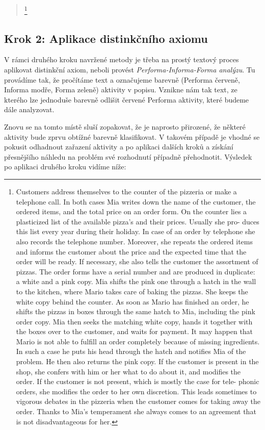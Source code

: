 \begin{quote}
\footnote{Customers address themselves to the counter of the pizzeria or make a telephone call. In both cases Mia writes down the name of the customer, the ordered items, and the total price on an order form. On the counter lies a plasticized list of the available pizza’s and their prices. Usually she pro- duces this list every year during their holiday. In case of an order by telephone she also records the telephone number. Moreover, she repeats the ordered items and informs the customer about the price and the expected time that the order will be ready. If necessary, she also tells the customer the assortment of pizzas. The order forms have a serial number and are produced in duplicate: a white and a pink copy. Mia shifts the pink one through a hatch in the wall to the kitchen, where Mario takes care of baking the pizzas. She keeps the white copy behind the counter. As soon as Mario has finished an order, he shifts the pizzas in boxes through the same hatch to Mia, including the pink order copy. Mia then seeks the matching white copy, hands it together with the boxes over to the customer, and waits for payment. It may happen that Mario is not able to fulfill an order completely because of missing ingredients. In such a case he puts his head through the hatch and notifies Mia of the problem. He then also returns the pink copy. If the customer is present in the shop, she confers with him or her what to do about it, and modifies the order. If the customer is not present, which is mostly the case for tele- phonic orders, she modifies the order to her own discretion. This leads sometimes to vigorous debates in the pizzeria when the customer comes for taking away the order. Thanks to Mia’s temperament she always comes to an agreement that is not disadvantageous for her.}
\end{quote}

\subsection{Krok 2: Aplikace distinkčního axiomu}
V rámci druhého kroku navržené metody je třeba na prostý textový proces aplikovat distinkční axiom, neboli provést \textit{Performa-Informa-Forma analýzu}. Tu provádíme tak, že pročítáme text a označujeme barevně (Performa červeně, Informa modře, Forma zeleně) aktivity v popisu. Vznikne nám tak text, ze kterého lze jednoduše barevně odlišit červené Performa aktivity, které budeme dále analyzovat.

Znovu se na tomto místě sluší zopakovat, že je naprosto přirozené, že některé aktivity bude zprvu obtížné barevně klasifikovat. V takovém případě je vhodné se pokusit odhadnout zařazení aktivity a po aplikaci dalších kroků a získání přesnějšího náhledu na problém své rozhodnutí případně přehodnotit. Výsledek po aplikaci druhého kroku vidíme níže:

